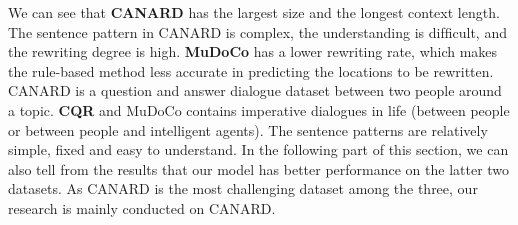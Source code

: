 We can see that \textbf{CANARD} \citep{elgohary-etal-2019-unpack} has the largest size and the longest context length.
The sentence pattern in CANARD is complex, the understanding is difﬁcult, and the rewriting degree is high.
\textbf{MuDoCo} \citep{martin-etal-2020-mudoco} 
has a lower rewriting rate, which makes the rule-based method less accurate in predicting the locations to be rewritten. CANARD is a question and answer dialogue dataset between two people around a topic.
\textbf{CQR} \citep{DBLP:journals/corr/abs-1903-11783} and MuDoCo contains imperative dialogues in life (between people or between people and intelligent agents). The sentence patterns are relatively simple, fixed and easy to understand. In the following part of this section, 
we can also tell from the results 
that our model has better performance on the latter two datasets.
As CANARD is the most challenging dataset among the three,
our research is mainly conducted on CANARD.

